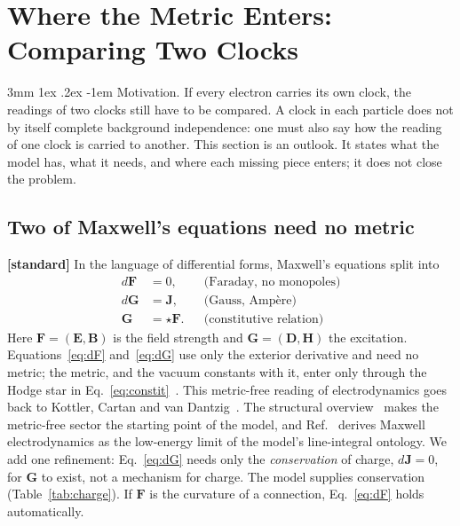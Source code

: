 \documentclass[%
 reprint, amsmath,amssymb, aps, prb, ]{revtex4-2}
\makeatletter
\numberwithin{equation}{section}
\renewcommand\paragraph{%
  \@startsection{paragraph}{4}{\z@}%
    {3mm \@plus 1ex \@minus .2ex}
    {-1em}
    {\normalfont\normalsize\itshape}}
\newcommand{\FF}{\mathbf{F}}
\newcommand{\hodge}{\star}
\makeatother
\begin{document}
\section{Where the Metric Enters: Comparing Two Clocks}
\label{sec:metric}

\paragraph{Motivation.} If every electron carries its own clock, the readings of two clocks still have to be compared. A clock in each particle does not by itself complete background independence: one must also say how the reading of one clock is carried to another. This section is an outlook. It states what the model has, what it needs, and where each missing piece enters; it does not close the problem.

\subsection{Two of Maxwell's equations need no metric}

\textbf{[standard]} In the language of differential forms, Maxwell's equations split into
\begin{align}
d\FF&=0, && \text{(Faraday, no monopoles)} \label{eq:dF}\\
d\mathbf{G}&=\mathbf{J}, && \text{(Gauss, Amp\`ere)} \label{eq:dG}\\
\mathbf{G}&=\hodge\FF. && \text{(constitutive relation)} \label{eq:constit}
\end{align}
Here $\FF=(\mathbf{E},\mathbf{B})$ is the field strength and $\mathbf{G}=(\mathbf{D},\mathbf{H})$ the excitation. Equations~\eqref{eq:dF} and~\eqref{eq:dG} use only the exterior derivative and need no metric; the metric, and the vacuum constants with it, enter only through the Hodge star in Eq.~\eqref{eq:constit}~\cite{ref:hehl}. This metric-free reading of electrodynamics goes back to Kottler, Cartan and van Dantzig~\cite{ref:kottler,ref:cartan23,ref:vandantzig}. The structural overview~\cite{ref:p67} makes the metric-free sector the starting point of the model, and Ref.~\cite{ref:p54} derives Maxwell electrodynamics as the low-energy limit of the model's line-integral ontology. We add one refinement: Eq.~\eqref{eq:dG} needs only the \emph{conservation} of charge, $d\mathbf{J}=0$, for $\mathbf{G}$ to exist, not a mechanism for charge. The model supplies conservation (Table~\ref{tab:charge}). If $\FF$ is the curvature of a connection, Eq.~\eqref{eq:dF} holds automatically.
\end{document}
